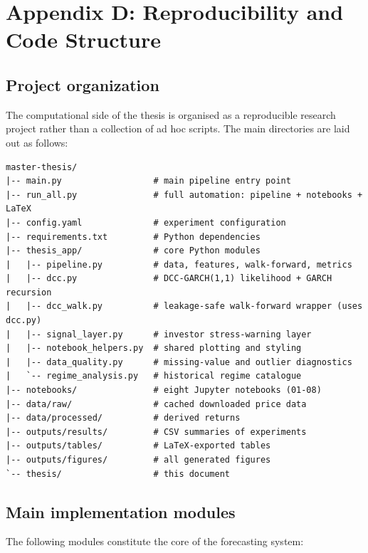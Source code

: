 \section{Appendix D: Reproducibility and Code Structure}

\subsection{Project organization}

The computational side of the thesis is organised as a reproducible research project rather than a collection of ad hoc scripts. The main directories are laid out as follows:

\begin{lstlisting}[language={}, caption={Top-level project directory structure.}, label=lst:dirstructure]
master-thesis/
|-- main.py                  # main pipeline entry point
|-- run_all.py               # full automation: pipeline + notebooks + LaTeX
|-- config.yaml              # experiment configuration
|-- requirements.txt         # Python dependencies
|-- thesis_app/              # core Python modules
|   |-- pipeline.py          # data, features, walk-forward, metrics
|   |-- dcc.py               # DCC-GARCH(1,1) likelihood + GARCH recursion
|   |-- dcc_walk.py          # leakage-safe walk-forward wrapper (uses dcc.py)
|   |-- signal_layer.py      # investor stress-warning layer
|   |-- notebook_helpers.py  # shared plotting and styling
|   |-- data_quality.py      # missing-value and outlier diagnostics
|   `-- regime_analysis.py   # historical regime catalogue
|-- notebooks/               # eight Jupyter notebooks (01-08)
|-- data/raw/                # cached downloaded price data
|-- data/processed/          # derived returns
|-- outputs/results/         # CSV summaries of experiments
|-- outputs/tables/          # LaTeX-exported tables
|-- outputs/figures/         # all generated figures
`-- thesis/                  # this document
\end{lstlisting}

\subsection{Main implementation modules}

The following modules constitute the core of the forecasting system:

